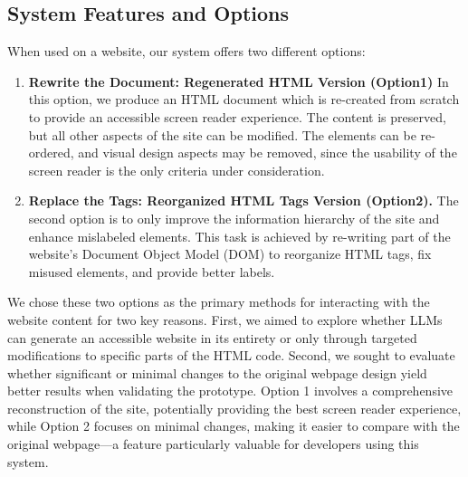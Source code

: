 \subsection{System Features and Options}

When used on a website, our system offers two different options: %

\begin{enumerate}
    \item \textbf{Rewrite the Document: Regenerated HTML Version (Option1) } In this option, we produce an HTML document which is re-created from scratch to provide an accessible screen reader experience. The content is preserved, but all other aspects of the site can be modified. The elements can be re-ordered, and visual design aspects may be removed, since the usability of the screen reader is the only criteria under consideration.
    \item \textbf{Replace the Tags: Reorganized HTML Tags Version (Option2).} The second option is to only improve the information hierarchy of the site and enhance mislabeled elements. This task is achieved by re-writing part of the website's Document Object Model (DOM) to reorganize HTML tags, fix misused elements, and provide better labels.
\end{enumerate}

We chose these two options as the primary methods for interacting with the website content for two key reasons. First, we aimed to explore whether LLMs can generate an accessible website in its entirety or only through targeted modifications to specific parts of the HTML code. Second, we sought to evaluate whether significant or minimal changes to the original webpage design yield better results when validating the prototype. Option 1 involves a comprehensive reconstruction of the site, potentially providing the best screen reader experience, while Option 2 focuses on minimal changes, making it easier to compare with the original webpage—a feature particularly valuable for developers using this system.

